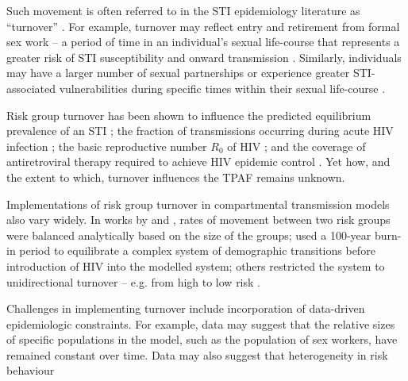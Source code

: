 Such movement is often referred to in the STI epidemiology literature as
``turnover'' \citep{Watts2010}.
For example, turnover may reflect entry and retirement from
formal sex work -- a period of time in an individual's sexual life-course
that represents a greater risk of STI susceptibility and 
onward transmission \citep{Watts2010}. Similarly, individuals 
may have a larger number of sexual partnerships or experience
greater STI-associated vulnerabilities during specific times
within their sexual life-course \citep{Marston2006}.
\par
Risk group turnover has been shown to 
influence the predicted equilibrium prevalence of an STI \citep{Stigum1994,Zhang2012};
the fraction of transmissions occurring during acute HIV infection \citep{Zhang2012};
the basic reproductive number $R_0$ of HIV \citep{Henry2015}; and
the coverage of antiretroviral therapy required to achieve HIV epidemic control \citep{Henry2015}.
Yet how, and the extent to which, turnover influences the TPAF remains unknown.
\par
Implementations of risk group turnover in compartmental transmission models also vary widely.
In works by \citeauthor{Koopman1997} and \citeauthor{Stigum1994},
rates of movement between two risk groups
were balanced analytically based on the size of the groups;
\citet{Boily2015} used a 100-year burn-in period
to equilibrate a complex system of demographic transitions before 
introduction of HIV into the modelled system;
others restricted the system to unidirectional turnover -- e.g. from high to low risk
\citep{Eaton2014}.
\par
Challenges in implementing turnover include
incorporation of data-driven epidemiologic constraints.
For example, data may suggest
that the relative sizes of specific populations in the model,
such as the population of sex workers,
have remained constant over time. %
Data may also suggest that heterogeneity in risk behaviour

